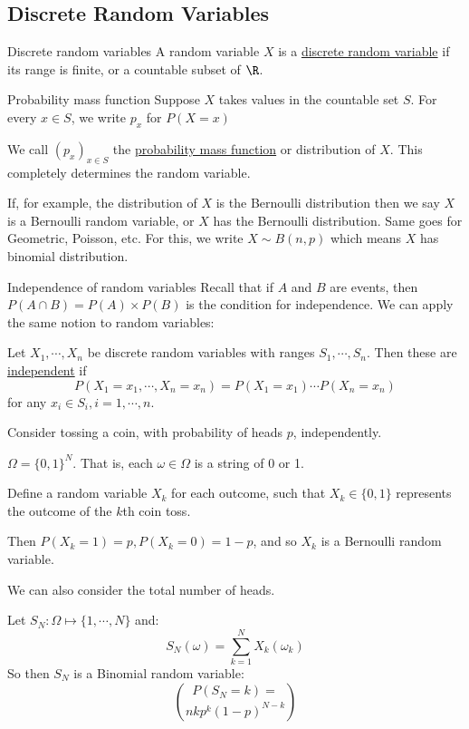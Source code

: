 \documentclass[../Main.tex]{subfiles}
\begin{document}
\subsection{Discrete Random Variables}
\begin{definition}{Discrete random variables}
    A random variable $X$ is a \underline{discrete random variable} if its range is finite, or a countable subset of $\R$.
\end{definition}
\begin{definition}{Probability mass function}
    Suppose $X$ takes values in the countable set $S$. For every $x \in S$, we write $p_x$ for $P(X = x)$\par
    We call $(p_x)_{x \in S}$ the \underline{probability mass function} or distribution of $X$. This completely determines the random variable.
\end{definition}
If, for example, the distribution of $X$ is the Bernoulli distribution then we say $X$ is a Bernoulli random variable, or $X$ has the Bernoulli distribution. Same goes for Geometric, Poisson, etc. For this, we write $X \sim B(n, p)$ which means $X$ has binomial distribution.
\begin{definition}{Independence of random variables}
    Recall that if $A$ and $B$ are events, then $P(A \cap B) = P(A) \times P(B)$ is the condition for independence. We can apply the same notion to random variables:\par
    Let $X_1, \cdots, X_n$ be discrete random variables with ranges $S_1, \cdots, S_n$. Then these are \underline{independent} if 
    \begin{equation*}
        P(X_1 = x_1, \cdots, X_n = x_n) = P(X_1 = x_1) \cdots P(X_n = x_n)
    \end{equation*}
    for any $x_i \in S_i, i = 1, \cdots, n$.
\end{definition}
\begin{example}
    Consider tossing a coin, with probability of heads $p$, independently.\par
    $\Omega = \{0, 1\}^N$. That is, each $\omega \in \Omega$ is a string of 0 or 1.\par
    Define a random variable $X_k$ for each outcome, such that $X_k \in \{0, 1\}$ represents the outcome of the $k$th coin toss.\par
    Then $P(X_k = 1) = p, P(X_k = 0) = 1-p$, and so $X_k$ is a Bernoulli random variable.\par
    We can also consider the total number of heads.\par
    Let $S_N : \Omega \mapsto \{1, \cdots, N\}$ and:
    \begin{equation*}
        S_N(\omega) = \sum_{k=1}^N X_k(\omega_k)
    \end{equation*}
    So then $S_N$ is a Binomial random variable:
    \begin{equation*}
        P(S_N = k) = \choose{n}{k} p^k (1-p)^{N-k}
    \end{equation*}
\end{example}
\end{document}

